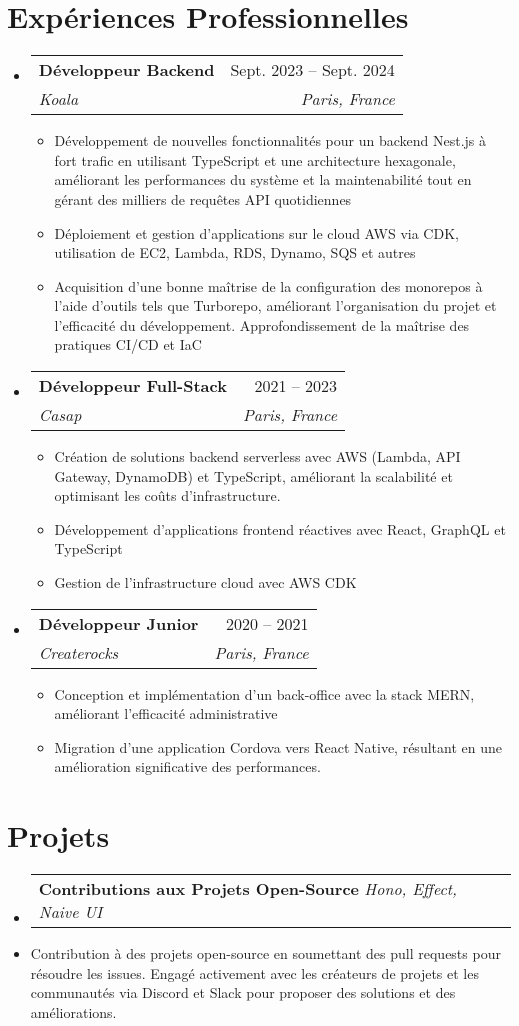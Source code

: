 \documentclass[letterpaper,11pt]{article}
\makeatletter
\newcommand{\resumeItem}[1]{
  \item\small{
    {#1 \vspace{-2pt}}
  }
}
\newcommand{\resumeSubheading}[4]{
  \vspace{-2pt}\item
    \begin{tabular*}{0.97\textwidth}[t]{l@{\extracolsep{\fill}}r}
      \textbf{#1} & #2 \\
      \textit{\small#3} & \textit{\small #4} \\
    \end{tabular*}\vspace{-7pt}
}
\newcommand{\resumeProjectHeading}[2]{
    \item
    \begin{tabular*}{0.97\textwidth}{l@{\extracolsep{\fill}}r}
      \small#1 & #2 \\
    \end{tabular*}\vspace{-7pt}
}
\newcommand{\resumeSubHeadingListStart}{\begin{itemize}[leftmargin=0.15in, label={}]}
\newcommand{\resumeSubHeadingListEnd}{\end{itemize}}
\newcommand{\resumeItemListStart}{\begin{itemize}}
\newcommand{\resumeItemListEnd}{\end{itemize}\vspace{-5pt}}
\makeatother
\begin{document}
\section{Expériences Professionnelles}
  \resumeSubHeadingListStart

    \resumeSubheading
      {Développeur Backend}{Sept. 2023 -- Sept. 2024}
      {Koala}{Paris, France}
      \resumeItemListStart
        \resumeItem{Développement de nouvelles fonctionnalités pour un backend Nest.js à fort trafic en utilisant TypeScript et une architecture hexagonale, améliorant les performances du système et la maintenabilité tout en gérant des milliers de requêtes API quotidiennes}
        \resumeItem{Déploiement et gestion d'applications sur le cloud AWS via CDK, utilisation de EC2, Lambda, RDS, Dynamo, SQS et autres}
        \resumeItem{Acquisition d'une bonne maîtrise de la configuration des monorepos à l'aide d'outils tels que Turborepo, améliorant l'organisation du projet et l'efficacité du développement. Approfondissement de la maîtrise des pratiques CI/CD et IaC}
      \resumeItemListEnd

    \resumeSubheading
      {Développeur Full-Stack}{2021 -- 2023}
      {Casap}{Paris, France}
      \resumeItemListStart
      \resumeItem{Création de solutions backend serverless avec AWS (Lambda, API Gateway, DynamoDB) et TypeScript, améliorant la scalabilité et optimisant les coûts d'infrastructure.}
      \resumeItem{Développement d'applications frontend réactives avec React, GraphQL et TypeScript}
      \resumeItem{Gestion de l'infrastructure cloud avec AWS CDK}
    \resumeItemListEnd

    \resumeSubheading
      {Développeur Junior}{2020 -- 2021}
      {Createrocks}{Paris, France}
      \resumeItemListStart
        \resumeItem{Conception et implémentation d'un back-office avec la stack MERN, améliorant l'efficacité administrative}
        \resumeItem{Migration d'une application Cordova vers React Native, résultant en une amélioration significative des performances.}
      \resumeItemListEnd

  \resumeSubHeadingListEnd

\section{Projets}
    \resumeSubHeadingListStart
      \resumeProjectHeading
          {\textbf{Contributions aux Projets Open-Source} \emph{Hono, Effect, Naive UI} }{}
          \resumeItem{Contribution à des projets open-source en soumettant des pull requests pour résoudre les issues. Engagé activement avec les créateurs de projets et les communautés via Discord et Slack pour proposer des solutions et des améliorations.}
    \resumeSubHeadingListEnd
\end{document}
